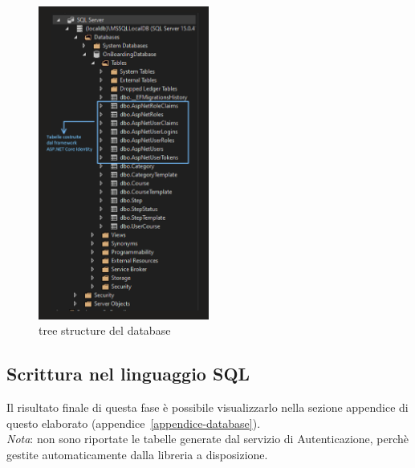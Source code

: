 \begin{figure}[H]
	\centering
	\includegraphics[width=0.5\textwidth]{img/TreeStructureDatabase.png}
	\caption{tree structure del database}
	\label{fig:TreeStructureDatabase}
\end{figure}
%
\subsection{Scrittura nel linguaggio SQL}
Il risultato finale di questa fase è possibile visualizzarlo nella sezione appendice di questo elaborato (appendice~\ref{appendice-database}).\\ 
\textit{Nota}: non sono riportate le tabelle generate dal servizio di Autenticazione, perchè gestite automaticamente dalla
libreria a disposizione.
%
